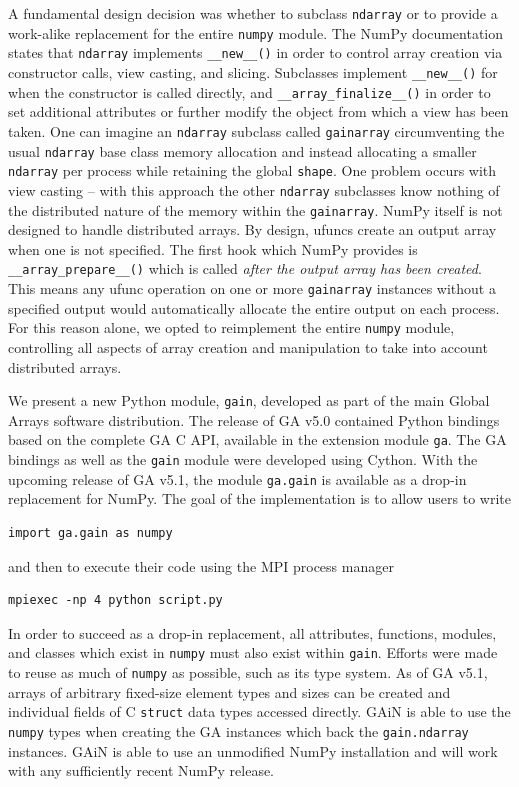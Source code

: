 \documentclass{sigplanconf}
\begin{document}
A fundamental design decision was whether to subclass \verb=ndarray= or to
provide a work-alike replacement for the entire \verb=numpy= module. The NumPy
documentation states that \verb=ndarray= implements \verb=__new__()= in order
to control array creation via constructor calls, view casting, and slicing.
Subclasses implement \verb=__new__()= for when the constructor is called
directly, and \linebreak\verb=__array_finalize__()= in order to set additional
attributes or further modify the object from which a view has been taken. One
can imagine an \verb=ndarray= subclass called \verb=gainarray= circumventing
the usual \verb=ndarray= base class memory allocation and instead allocating a
smaller \verb=ndarray= per process while retaining the global \verb=shape=.
One problem occurs with view casting -- with this approach the other
\verb=ndarray= subclasses know nothing of the distributed nature of the memory
within the \verb=gainarray=. NumPy itself is not designed to handle
distributed arrays. By design, ufuncs create an output array when one is not
specified. The first hook which NumPy provides is \verb=__array_prepare__()=
which is called \emph{after the output array has been created}. This means any
ufunc operation on one or more \verb=gainarray= instances without a specified
output would automatically allocate the entire output on each process. For
this reason alone, we opted to reimplement the entire \verb=numpy= module,
controlling all aspects of array creation and manipulation to take into
account distributed arrays.

We present a new Python module, \verb=gain=, developed as part of the main
Global Arrays software distribution. The release of GA v5.0 contained Python
bindings based on the complete GA C API, available in the extension module
\verb=ga=. The GA bindings as well as the \verb=gain= module were developed
using Cython. With the upcoming release of GA v5.1, the module \verb=ga.gain=
is available as a drop-in replacement for NumPy.  The goal of the
implementation is to allow users to write
\begin{verbatim}
import ga.gain as numpy
\end{verbatim}
and then to execute their code using the MPI process manager
\begin{verbatim}
mpiexec -np 4 python script.py
\end{verbatim}

In order to succeed as a drop-in replacement, all attributes, functions,
modules, and classes which exist in \verb=numpy= must also exist within
\verb=gain=.  Efforts were made to reuse as much of \verb=numpy= as possible,
such as its type system. As of GA v5.1, arrays of arbitrary fixed-size element
types and sizes can be created and individual fields of C \verb=struct= data
types accessed directly.  GAiN is able to use the \verb=numpy= types when
creating the GA instances which back the \verb=gain.ndarray= instances. GAiN
is able to use an unmodified NumPy installation and will work with any
sufficiently recent NumPy release.
\end{document}

